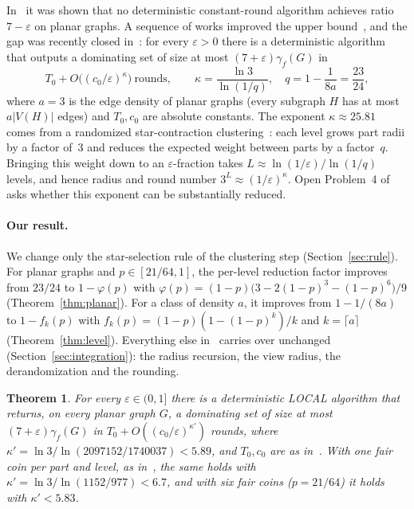 \documentclass[11pt]{article}
\newtheorem{theorem}{Theorem}
\theoremstyle{remark}
\begin{document}
In~\cite{HLS14} it was shown that no deterministic constant-round algorithm achieves ratio
$7-\varepsilon$ on planar graphs. A sequence of works
improved the upper bound~\cite{HKOSV22,W26}, and the gap was recently closed in~\cite{AS26}: for
every $\varepsilon>0$ there is a deterministic algorithm that outputs a dominating set of size at most $(7+\varepsilon)\gamma_f(G)$ in
\[
  T_0+O\big((c_0/\varepsilon)^{\kappa}\big)\ \text{rounds},\qquad
  \kappa=\frac{\ln 3}{\ln(1/q)},\quad q=1-\frac{1}{8a}=\frac{23}{24},
\]
where $a=3$ is the edge density of planar graphs (every subgraph $H$ has at most $a|V(H)|$ edges) and $T_0,c_0$ are absolute constants. The exponent
$\kappa\approx 25.81$ comes from a randomized star-contraction clustering~\cite{LR15,CHW08}:
each level grows part radii by a factor of~$3$ and reduces the expected weight between parts by a factor~$q$.
Bringing this weight down to an $\varepsilon$-fraction takes $L\approx\ln(1/\varepsilon)/\ln(1/q)$
levels, and hence radius and round number $3^L\approx(1/\varepsilon)^{\kappa}$.
Open Problem~4 of~\cite{AS26} asks whether this exponent can be substantially reduced.

\paragraph{Our result.} We change only the star-selection rule of the clustering step
(Section~\ref{sec:rule}). For planar graphs and $p\in[21/64,1]$, the per-level reduction factor
improves from $23/24$ to $1-\varphi(p)$ with $\varphi(p)=(1-p)\big(3-2(1-p)^3-(1-p)^6\big)/9$
(Theorem~\ref{thm:planar}). For a class of density $a$, it improves from $1-1/(8a)$ to
$1-f_k(p)$ with $f_k(p)=(1-p)(1-(1-p)^k)/k$ and $k=\lceil a\rceil$ (Theorem~\ref{thm:level}).
Everything else in~\cite{AS26} carries over unchanged (Section~\ref{sec:integration}):
the radius recursion, the view radius, the derandomization and the rounding.

\begin{theorem}\label{thm:main}
For every $\varepsilon\in(0,1]$ there is a deterministic LOCAL algorithm that returns, on every
planar graph $G$, a dominating set of size at most $(7+\varepsilon)\gamma_f(G)$ in
$T_0+O((c_0/\varepsilon)^{\kappa'})$ rounds, where $\kappa'=\ln 3/\ln(2097152/1740037)<5.89$, and
$T_0,c_0$ are as in~\cite[Cor.~8.1]{AS26}. With one fair coin per part and level, as
in~\cite{AS26}, the same holds with $\kappa'=\ln3/\ln(1152/977)<6.7$, and with six fair coins
($p=21/64$) it holds with $\kappa'<5.83$.
\end{theorem}
\end{document}
